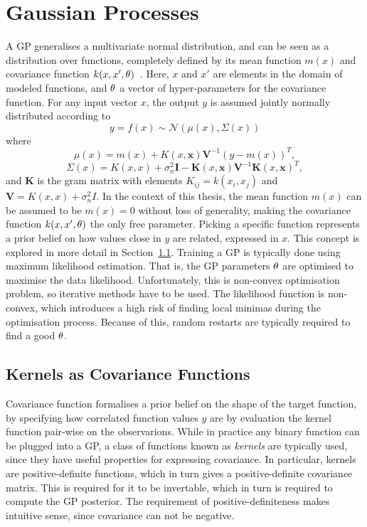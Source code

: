 \section{Gaussian Processes}
A GP generalises a multivariate normal distribution, and can be seen
as a distribution over functions, completely defined by its
mean function $m(x)$ and covariance function $k(x, x', \theta)$~\cite{Rasmussen-Williams-2006}. 
Here, $x$ and $x'$ are
elements in the domain of modeled functions, and $\theta$ a
vector of hyper-parameters for the covariance function. For any input
vector $x$, the output $y$ is assumed jointly normally distributed according to
\begin{equation}
  \label{eq:gp}
  y = f(x) \sim \mathcal{N}(\mu(x), \Sigma(x))
\end{equation}
where
\begin{equation}
  \label{eq:gp-mean-function}
  \mu(x) = m(x) + K(x, \textbf{x})\textbf{V}^{-1}{(y-m(x))}^{T},
\end{equation}
\begin{equation}
  \label{eq:gp-covariance-function}
  \Sigma(x) = K(x, x) + \sigma^{2}_n\textbf{I} - \textbf{K}(x, \textbf{x})\textbf{V}^{-1}{\textbf{K}(x, \textbf{x})}^{T},
\end{equation}
and $\textbf{K}$ is the gram matrix with elements $K_{ij} = k(x_i, x_j)$ and $\textbf{V}
= K(x, x) + \sigma_n^2I$.
In the context of this thesis, the mean function $m(x)$ can be assumed to be $m(x) = 0$
without loss of generality, making the covariance function $k(x, x', \theta)$
the only free parameter. Picking a specific function represents a prior
belief on how values close in $y$ are related, expressed in $x$. This
concept is explored in more detail in Section~\ref{sec:kernels-as-priors}.
Training a GP is typically done using maximum likelihood
estimation. That is, the GP parameters $\theta$ are optimised to
maximise the data likelihood. Unfortunately, this is non-convex
optimisation problem, so
iterative methods have to be used. The likelihood function is
non-convex, which introduces a high risk of finding local minimas
during the optimisation process. Because of this, random restarts are
typically required to find a good $\theta$.

\subsection{Kernels as Covariance Functions}\label{sec:kernels-as-priors}
Covariance function formalises a prior belief on the shape of the target
function, by specifying how correlated function values $y$ are by
evaluation the kernel function pair-wise on the observarions. 
While in practice any binary function can be plugged into
a GP, a class of functions known as \textit{kernels} are typically
used, since they have useful properties for expressing covariance. In
particular, kernels are positive-definite functions, which in turn
gives a positive-definite covariance matrix. This is required for it
to be invertable, which in turn is required to compute the GP posterior. 
The requirement of positive-definiteness makes intuitive sense, since covariance can not
be negative. 

